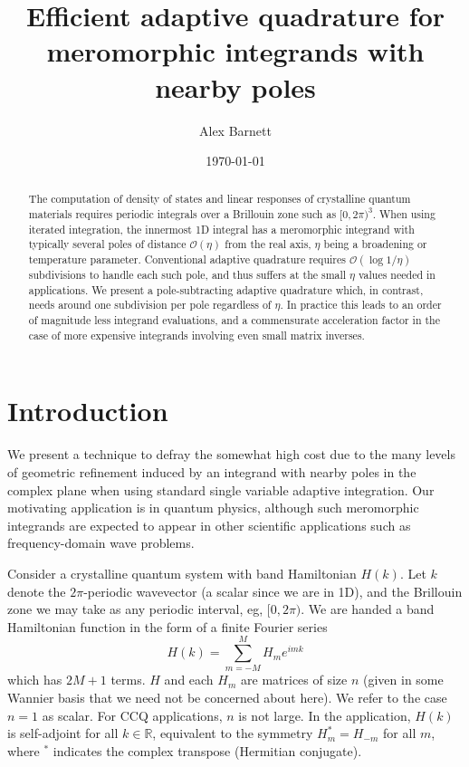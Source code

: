 \documentclass[11pt]{article}
\newcommand{\be}{\begin{equation}}
\newcommand{\ee}{\end{equation}}
\newcommand{\bigO}{{\mathcal O}}
\newcommand{\R}{\mathbb{R}}
\begin{document}
\title{Efficient adaptive quadrature for meromorphic integrands with nearby poles}
\author{Alex Barnett}
\date{\today}
\maketitle
\begin{abstract}
  The computation of density of states and linear responses of crystalline
  quantum materials requires periodic integrals over a Brillouin zone such as $[0,2\pi)^3$.
  When using iterated integration,
  the innermost 1D integral has a meromorphic integrand
  with typically several poles of distance $\bigO(\eta)$ from the real axis,
  $\eta$ being a broadening or temperature parameter.
  Conventional adaptive quadrature requires $\bigO(\log 1/\eta)$ subdivisions to
  handle each such pole, and thus suffers at the small $\eta$ values needed in applications.
  We present a pole-subtracting adaptive quadrature which, in contrast,
  needs around one subdivision per pole regardless of $\eta$.
  In practice this leads to an order of magnitude less integrand evaluations,
  and a commensurate acceleration factor in the case of more expensive integrands
  involving even small matrix inverses.
\end{abstract}

\section{Introduction}

We present a technique to defray the somewhat high
cost due to the many levels of geometric refinement induced by
an integrand with nearby poles in the complex plane
when using standard single variable adaptive integration.
Our motivating application is in quantum physics, although such meromorphic
integrands are expected to appear in other scientific applications such as
frequency-domain wave problems.

Consider a crystalline quantum system with band Hamiltonian $H(k)$.
Let $k$ denote the $2\pi$-periodic wavevector (a scalar since we are in 1D), and
the Brillouin zone we may take as any periodic interval, eg, $[0,2\pi)$.
We are handed a band Hamiltonian function in the form of a finite Fourier
series
\be
H(k) = \sum_{m=-M}^M H_m e^{imk}
\label{Hk}
\ee
which has $2M+1$ terms. $H$ and each $H_m$ are matrices of size $n$
(given in some Wannier basis that we need not be concerned about here).
We refer to the case $n=1$ as scalar.
For CCQ applications, $n$ is not large.
In the application, $H(k)$ is self-adjoint for all $k\in\R$,
equivalent to the symmetry $H_m^* = H_{-m}$ for all $m$, where
$^*$ indicates the complex transpose (Hermitian conjugate).
\end{document}
